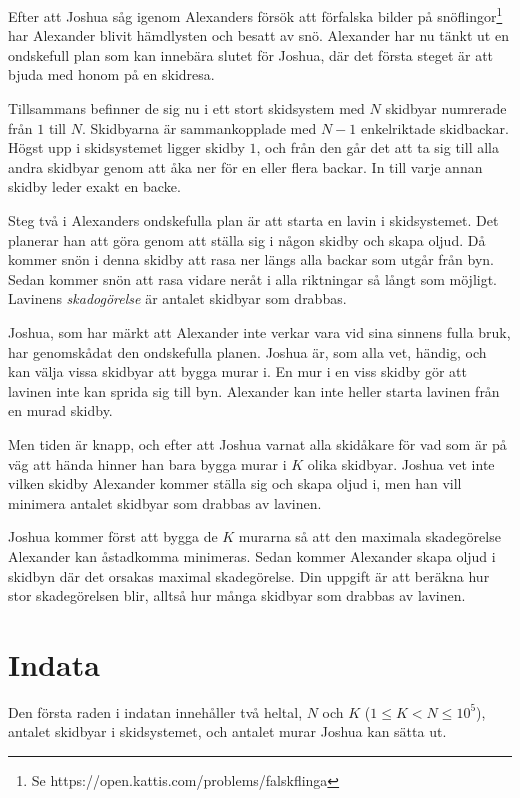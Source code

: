 \noindent
Efter att Joshua såg igenom Alexanders försök att förfalska bilder på 
snöflingor\footnote{Se https://open.kattis.com/problems/falskflinga}
har Alexander blivit hämdlysten och besatt av snö.
Alexander har nu tänkt ut en ondskefull plan som kan innebära slutet för Joshua,
där det första steget är att bjuda med honom på en skidresa.

Tillsammans befinner de sig nu i ett stort skidsystem med $N$ skidbyar numrerade från $1$ till $N$.
Skidbyarna är sammankopplade med $N-1$ enkelriktade skidbackar.
Högst upp i skidsystemet ligger skidby $1$,
och från den går det att ta sig till alla andra
skidbyar genom att åka ner för en eller flera backar.
In till varje annan skidby leder exakt en backe.

Steg två i Alexanders ondskefulla plan är att 
starta en lavin i skidsystemet.
Det planerar han att göra genom att ställa sig i någon skidby och skapa oljud.
Då kommer snön i denna skidby att rasa ner längs alla backar som utgår från byn.
Sedan kommer snön att rasa vidare neråt i alla riktningar så långt som möjligt.
Lavinens \emph{skadogörelse} är antalet skidbyar som drabbas.

Joshua, som har märkt att Alexander inte verkar vara vid sina sinnens fulla bruk,
har genomskådat den ondskefulla planen.
Joshua är, som alla vet, händig, och kan välja vissa skidbyar att bygga murar i.
En mur i en viss skidby gör att lavinen inte kan sprida sig till byn.
Alexander kan inte heller starta lavinen från en murad skidby.

Men tiden är knapp, och efter att Joshua varnat
alla skidåkare för vad som är på väg att hända
hinner han bara bygga murar i $K$ olika skidbyar.
Joshua vet inte vilken skidby Alexander kommer ställa sig och skapa oljud i,
men han vill minimera antalet skidbyar som drabbas av lavinen.

Joshua kommer först att bygga de $K$ murarna så att den maximala skadegörelse
Alexander kan åstadkomma minimeras.
Sedan kommer Alexander skapa oljud i skidbyn där det orsakas maximal skadegörelse.
Din uppgift är att beräkna hur stor skadegörelsen blir,
alltså hur många skidbyar som drabbas av lavinen.

\section*{Indata}
Den första raden i indatan innehåller två heltal, $N$ och $K$ ($1 \le K < N \le 10^5$), 
antalet skidbyar i skidsystemet, och antalet murar Joshua kan sätta ut.

